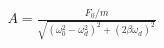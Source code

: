 \documentclass[preview]{standalone}
\begin{document}
\begin{align*}
A = \frac{F_0/m}{\sqrt{(\omega_0^2 - \omega_d^2)^2 + (2\beta\omega_d)^2}}
\end{align*}
\end{document}
